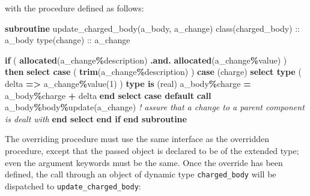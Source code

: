 \documentclass[
  paper=a4,
  ,captions=tableheading
]{scrartcl}
\newenvironment{Shaded}{\begin{snugshade}}{\end{snugshade}}
\newcommand{\CommentTok}[1]{\textcolor[rgb]{0.56,0.35,0.01}{\textit{#1}}}
\newcommand{\DataTypeTok}[1]{\textcolor[rgb]{0.13,0.29,0.53}{#1}}
\newcommand{\DecValTok}[1]{\textcolor[rgb]{0.00,0.00,0.81}{#1}}
\newcommand{\FunctionTok}[1]{\textcolor[rgb]{0.13,0.29,0.53}{\textbf{#1}}}
\newcommand{\KeywordTok}[1]{\textcolor[rgb]{0.13,0.29,0.53}{\textbf{#1}}}
\newcommand{\NormalTok}[1]{#1}
\newcommand{\OperatorTok}[1]{\textcolor[rgb]{0.81,0.36,0.00}{\textbf{#1}}}
\newcommand{\StringTok}[1]{\textcolor[rgb]{0.31,0.60,0.02}{#1}}
\begin{document}
with the procedure defined as follows:

\begin{Shaded}
\begin{Highlighting}[]
\KeywordTok{subroutine}\NormalTok{ update\_charged\_body(a\_body, a\_change)}
  \DataTypeTok{class(charged\_body)} \DataTypeTok{::}\NormalTok{ a\_body}
  \DataTypeTok{type(change)} \DataTypeTok{::}\NormalTok{ a\_change}

  \KeywordTok{if}\NormalTok{ ( }\FunctionTok{allocated}\NormalTok{(a\_change}\OperatorTok{\%}\NormalTok{description) }\OperatorTok{.and.} \FunctionTok{allocated}\NormalTok{(a\_change}\OperatorTok{\%}\DataTypeTok{value}\NormalTok{) ) }\KeywordTok{then}
    \KeywordTok{select case}\NormalTok{ ( }\FunctionTok{trim}\NormalTok{(a\_change}\OperatorTok{\%}\NormalTok{description) )}
     \KeywordTok{case}\NormalTok{ (}\StringTok{\textquotesingle{}charge\textquotesingle{}}\NormalTok{)}
      \KeywordTok{select type}\NormalTok{ ( delta }\KeywordTok{=}\OperatorTok{\textgreater{}}\NormalTok{ a\_change}\OperatorTok{\%}\DataTypeTok{value}\NormalTok{(}\DecValTok{1}\NormalTok{) )}
       \KeywordTok{type is}\NormalTok{ (}\DataTypeTok{real}\NormalTok{)}
\NormalTok{        a\_body}\OperatorTok{\%}\NormalTok{charge }\KeywordTok{=}\NormalTok{ a\_body}\OperatorTok{\%}\NormalTok{charge }\KeywordTok{+}\NormalTok{ delta}
      \KeywordTok{end select}
     \KeywordTok{case default}
      \KeywordTok{call}\NormalTok{ a\_body}\OperatorTok{\%}\NormalTok{body}\OperatorTok{\%}\NormalTok{update(a\_change)}
      \CommentTok{! assure that a change to a parent component is dealt with}
    \KeywordTok{end select}
  \KeywordTok{end if}
\KeywordTok{end subroutine}
\end{Highlighting}
\end{Shaded}

The overriding procedure must use the same interface as the overridden
procedure, except that the passed object is declared to be of the
extended type; even the argument keywords must be the same. Once the
override has been defined, the call through an object of dynamic type
\texttt{charged\_body} will be dispatched to
\texttt{update\_charged\_body}:
\end{document}

